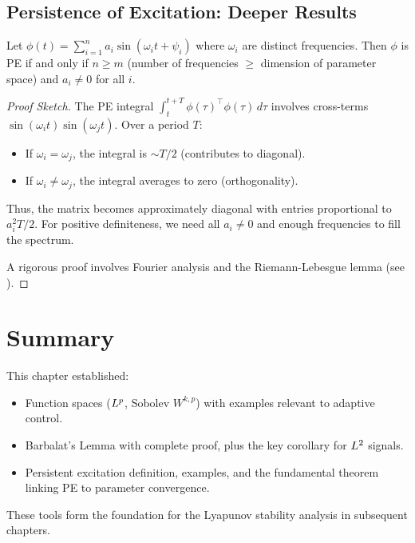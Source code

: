 \subsection{Persistence of Excitation: Deeper Results}

\begin{theorem}
\label{thm:pe_spectral}
Let $\phi(t) = \sum_{i=1}^n a_i \sin(\omega_i t + \psi_i)$ where $\omega_i$ are distinct frequencies. Then $\phi$ is PE if and only if $n \geq m$ (number of frequencies $\geq$ dimension of parameter space) and $a_i \neq 0$ for all $i$.
\end{theorem}

\begin{proof}[Proof Sketch]
The PE integral $\int_t^{t+T} \phi(\tau)^\top \phi(\tau) \, d\tau$ involves cross-terms $\sin(\omega_i t) \sin(\omega_j t)$. Over a period $T$:
\begin{itemize}
    \item If $\omega_i = \omega_j$, the integral is $\sim T/2$ (contributes to diagonal).
    \item If $\omega_i \neq \omega_j$, the integral averages to zero (orthogonality).
\end{itemize}

Thus, the matrix becomes approximately diagonal with entries proportional to $a_i^2 T/2$. For positive definiteness, we need all $a_i \neq 0$ and enough frequencies to fill the spectrum.

A rigorous proof involves Fourier analysis and the Riemann-Lebesgue lemma (see \cite{Sastry1989}).
\end{proof}

\section{Summary}

This chapter established:
\begin{itemize}
    \item Function spaces ($L^{p}$, Sobolev $W^{k,p}$) with examples relevant to adaptive control.
    \item Barbalat's Lemma with complete proof, plus the key corollary for $L^{2}$ signals.
    \item Persistent excitation definition, examples, and the fundamental theorem linking PE to parameter convergence.
\end{itemize}

These tools form the foundation for the Lyapunov stability analysis in subsequent chapters.
